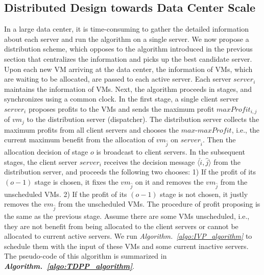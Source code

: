 \documentclass[10pt,journal]{IEEEtran}
\begin{document}
\subsection{Distributed Design towards Data Center Scale}
In a large data center, it is time-consuming to gather the detailed information about each server and run the algorithm on a single server. We now propose a distribution scheme, which opposes to the algorithm introduced in the previous section that centralizes the information and picks up the best candidate server. Upon each new VM arriving at the data center, the information of VMs, which are waiting to be allocated, are passed to each active server. Each server $server_i$ maintains the information of VMs. Next, the algorithm proceeds in stages, and synchronizes using a common clock. In the first stage, a single client server $server_i$ proposes profits to the VMs and sends the maximum profit $maxProfit_{i,j}$ of $vm_j$ to the distribution server (dispatcher). The distribution server collects the maximum profits from all client servers and chooses the $max$-$maxProfit$, i.e., the current maximum benefit from the allocation of $vm_{\widehat{j}}$ on $server_{\widehat{i}}$. Then the allocation decision of stage $o$ is broadcast to client servers. In the subsequent stages, the client server $server_i$ receives the decision message $\langle{\widehat{i},\widehat{j}}\rangle$ from the distribution server, and proceeds the following two chooses: 1) If the profit of its $(o-1)$ stage is chosen, it fixes the $vm_{\widehat{j}}$ on it and removes the $vm_{\widehat{j}}$ from the unscheduled VMs. 2) If the profit of its $(o-1)$ stage is not chosen, it justly removes the $vm_{\widehat{j}}$ from the unscheduled VMs. The procedure of profit proposing is the same as the previous stage. Assume there are some VMs unscheduled, i.e., they are not benefit from being allocated to the client servers or cannot be allocated to current active servers. We run \textit{Algorithm.~\ref{algo:IVP_algorithm}} to schedule them with the input of these VMs and some current inactive servers. The pseudo-code of this algorithm is summarized in \textbf{\textit{Algorithm.~\ref{algo:TDPP_algorithm}}}.
\end{document}
